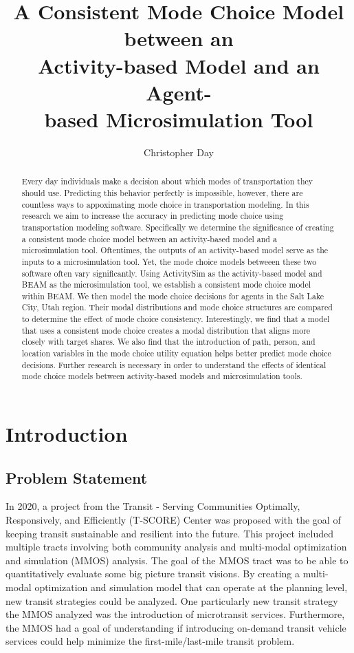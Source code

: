 \documentclass[12pt, oneside, openright]{byuthesis}
\title{A Consistent Mode Choice Model between an\\
Activity-based Model and an Agent-\\
based Microsimulation Tool}
\author{Christopher Day}
\begin{document}
\begin{abstract}
Every day individuals make a decision about which modes of transportation they should use. Predicting this behavior perfectly is impossible, however, there are countless ways to appoximating mode choice in transportation modeling. In this research we aim to increase the accuracy in predicting mode choice using transportation modeling software. Specifically we determine the significance of creating a consistent mode choice model between an activity-based model and a microsimulation tool. Oftentimes, the outputs of an activity-based model serve as the inputs to a microsimulation tool. Yet, the mode choice models betweeen these two software often vary significantly. Using ActivitySim as the activity-based model and BEAM as the microsimulation tool, we establish a consistent mode choice model within BEAM. We then model the mode choice decisions for agents in the Salt Lake City, Utah region. Their modal distributions and mode choice structures are compared to determine the effect of mode choice consistency. Interestingly, we find that a model that uses a consistent mode choice creates a modal distribution that aligns more closely with target shares. We also find that the introduction of path, person, and location variables in the mode choice utility equation helps better predict mode choice decisions. Further research is necessary in order to understand the effects of identical mode choice models between activity-based models and microsimulation tools.
\end{abstract}


\makefrontmatter %
\thesisbody

\hypertarget{introduction}{%
\chapter{Introduction}\label{introduction}}

\hypertarget{problem-statement}{%
\section{Problem Statement}\label{problem-statement}}

In 2020, a project from the Transit - Serving Communities Optimally, Responsively, and Efficiently (T-SCORE) Center was proposed with the goal of keeping transit sustainable and resilient into the future. This project included multiple tracts involving both community analysis and multi-modal optimization and simulation (MMOS) analysis. The goal of the MMOS tract was to be able to quantitatively evaluate some big picture transit visions. By creating a multi-modal optimization and simulation model that can operate at the planning level, new transit strategies could be analyzed. One particularly new transit strategy the MMOS analyzed was the introduction of microtransit services. Furthermore, the MMOS had a goal of understanding if introducing on-demand transit vehicle services could help minimize the first-mile/last-mile transit problem.
\end{document}
